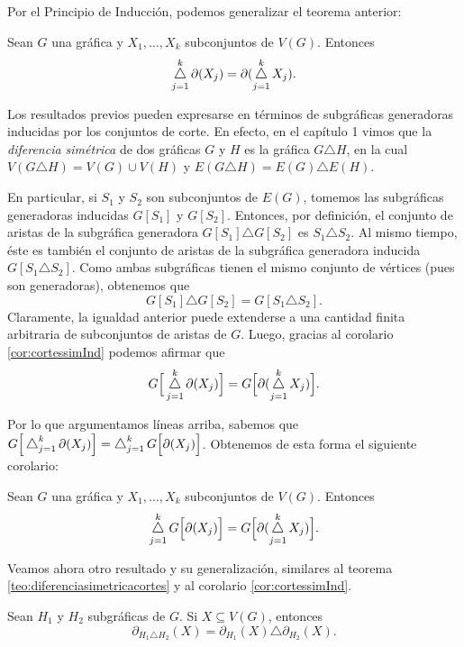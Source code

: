 Por el Principio de Inducción, podemos generalizar el teorema anterior:
\begin{cor}\label{cor:cortessimInd}
Sean $G$ una gráfica y $X_{1},\ldots, X_{k}$ subconjuntos de $V(G)$. Entonces $$\difsym_{j=1}^{k} \partial(X_{j}) = \partial(\difsym_{j=1}^{k} X_{j}).$$
\end{cor}

Los resultados previos pueden expresarse en términos de subgráficas generadoras inducidas por los conjuntos de corte. En efecto, en el capítulo 1 vimos que la \textit{diferencia simétrica} de dos gráficas $G$ y $H$ es la gráfica $G \triangle H$, en la cual $V(G \triangle H) = V(G) \cup V(H)$ y $E(G \triangle H) = E(G)\triangle E(H)$. 

En particular, si $S_{1}$ y $S_{2}$ son subconjuntos de $E(G)$, tomemos las subgráficas generadoras inducidas $G[S_{1}]$ y $G[S_{2}]$. Entonces, por definición, el conjunto de aristas de la subgráfica generadora  $G[S_{1}] \triangle G[S_{2}]$ es $S_{1} \triangle S_{2}$. Al mismo tiempo, éste es también el conjunto de aristas de la subgráfica generadora inducida $G[S_{1} \triangle S_{2}]$. Como ambas subgráficas tienen el mismo conjunto de vértices (pues son generadoras), obtenemos que 
$$G[S_{1}] \triangle G[S_{2}] = G[S_{1} \triangle S_{2}].$$ 
Claramente, la igualdad anterior puede extenderse a una cantidad finita arbitraria de subconjuntos de aristas de $G$. Luego, gracias al corolario \ref{cor:cortessimInd} podemos afirmar que
$$
G\Big[\difsym_{j=1}^{k} \partial(X_{j})\Big] = G\Big[\partial(\difsym_{j=1}^{k} X_{j})\Big].
$$

Por lo que argumentamos líneas arriba, sabemos que $G\Big[\difsym_{j=1}^{k} \partial(X_{j})\Big] = \difsym_{j=1}^{k}G\Big[ \partial(X_{j})\Big]$. Obtenemos de esta forma el siguiente corolario:

\begin{cor}\label{cor:difsimGeneradora}
Sean $G$ una gráfica y $X_{1},\ldots, X_{k}$ subconjuntos de $V(G)$. Entonces $$\difsym_{j=1}^{k}G\Big[ \partial(X_{j})\Big] = G\Big[\partial(\difsym_{j=1}^{k} X_{j})\Big].$$
\end{cor}

Veamos ahora otro resultado y su generalización, similares al teorema \ref{teo:diferenciasimetricacortes} y al corolario \ref{cor:cortessimInd}.

\begin{prop} \label{prop2}
Sean $H_{1}$ y $H_{2}$ subgráficas de $G$. Si $X \subseteq V(G)$, entonces 
$$
\partial_{H_{1} \triangle H_{2}}(X) = \partial_{H_{1}}(X) \triangle \partial_{H_{2}}(X).
$$
\end{prop}

